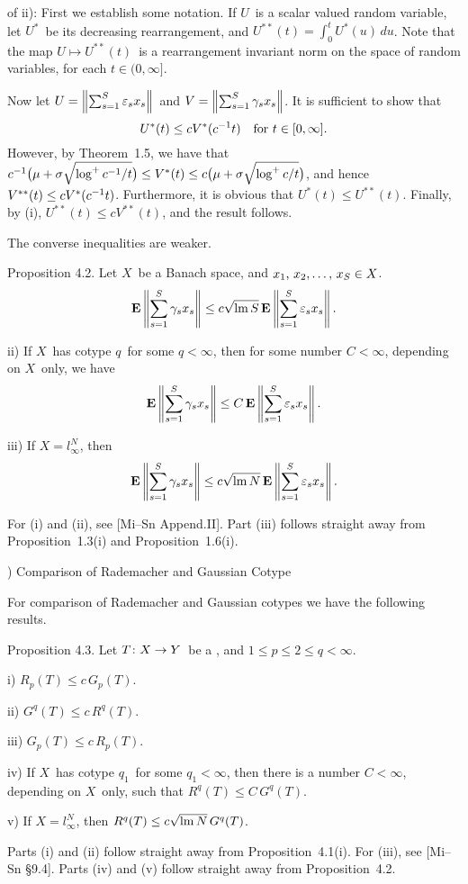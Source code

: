 \proof of ii):
First we establish some notation. If $U$\ is a scalar valued random
variable,
let $U^*$\ be its decreasing rearrangement, and $U^{**}(t)=\int_0^t
U^*(u)\,du$. Note that the map $U\mapsto U^{**}(t)$\ is a rearrangement
invariant
norm on the space of random variables, for each $t\in(0,\infty]$.
 
Now let $U=\left\| \sum_{s=1}^S \varepsilon_s x_s \right\|$\ and $V=\left\| \sum_{s=1}^S \gamma_s x_s \right\|$. It is sufficient
to show
that
$$ U^*(t) \le c V^*(c^{-1} t) \quad\hbox{for $t\in[0,\infty]$} .$$
However, by Theorem~1.5, we have that $c^{-1}\bigl(\mu+\sigma\sqrt{\log^+c^{-1}
/t}\bigr)
\le V^*(t) \le c\bigl(\mu+\sigma\sqrt{\log^+c/t}\bigr)$, and hence
$V^{**}(t) \le c
V^*(c^{-1} t)$. Furthermore, it is obvious that $U^*(t) \le U^{**}(t)$.
Finally,
by (i), $U^{**}(t) \le c V^{**}(t)$, and the result follows.
\endproof
 
The converse inequalities are weaker.
 
\proclaim Proposition 4.2. Let $X$\ be a Banach space, and $\xS\in
X$.
$$ {\bf E}\left\| \sum_{s=1}^S \gamma_s x_s \right\| \le c \sqrt{\mathop{\rm lm}\nolimits S}\, {\bf E}\left\| \sum_{s=1}^S \varepsilon_s x_s \right\| .$$
\item{ii)} If $X$\ has cotype $q$\ for some $q<\infty$,
then for some number $C<\infty$, depending on $X$\ only, we have
$$ {\bf E}\left\| \sum_{s=1}^S \gamma_s x_s \right\| \le C\, {\bf E}\left\| \sum_{s=1}^S \varepsilon_s x_s \right\| .$$
\item{iii)} If $X=l_\infty^N$, then
$$ {\bf E}\left\| \sum_{s=1}^S \gamma_s x_s \right\| \le c \sqrt{\mathop{\rm lm}\nolimits N}\, {\bf E}\left\| \sum_{s=1}^S \varepsilon_s x_s \right\| .$$
 
\Proof For (i) and (ii), see [Mi--Sn Append.II]. Part (iii)
follows straight away from Proposition~1.3(i) and Proposition~1.6(i).
\par \endproof
 
) Comparison of Rademacher and Gaussian Cotype
 
For comparison of Rademacher and Gaussian cotypes we have the following
results.
 
\proclaim Proposition 4.3. Let $T\colon X\to Y$\ be a \blobBs, and $1\le
p\le2\le q<\infty$.
\item{i)} $R_p(T) \le c \,G_p(T)$.
\item{ii)} $G^q(T) \le c \,R^q(T)$.
\item{iii)} $G_p(T) \le c \,R_p(T)$.
\item{iv)} If $X$\ has cotype $q_1$\ for some $q_1<\infty$, then
there is a
number $C<\infty$, depending on $X$\ only, such that $R^q(T) \le
C\, G^q(T)$.
\item{v)} If $X=l_\infty^N$, then $R^q(T) \le c \sqrt{\mathop{\rm lm}\nolimits N} \,G^q(T)$.
 
\Proof Parts (i) and (ii) follow straight away from Proposition~4.1(i).
For (iii), see
[Mi--Sn \S9.4]. Parts (iv) and (v) follow straight away from Proposition~4.2.
\par\endproof
 
